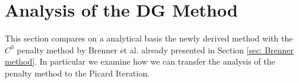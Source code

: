 
\section{Analysis of the DG Method} \label{sec: DG analysis}
This section compares on a analytical basis the newly derived method with the $C^0$ penalty method by Brenner et al. \cite{BGN+2011} already presented in Section \ref{sec: Brenner method}. In particular we examine how we can transfer the analysis of the penalty method to the Picard Iteration.

